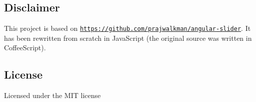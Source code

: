 \subsection*{Disclaimer}

This project is based on \href{https://github.com/prajwalkman/angular-slider}{\tt https\+://github.\+com/prajwalkman/angular-\/slider}. It has been rewritten from scratch in Java\+Script (the original source was written in Coffee\+Script).

\subsection*{License}

Licensed under the M\+IT license 